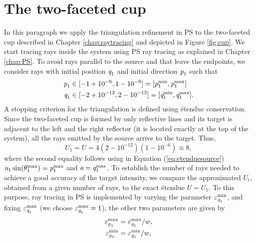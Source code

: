 \section{The two-faceted cup}
In this paragraph we apply the triangulation refinement in PS to the two-faceted cup described in Chapter \ref{chap:raytracing} and depicted in Figure \ref{fig:cup}. 
We start tracing rays inside the system using PS ray tracing as explained in Chapter \ref{chap:PS}. To avoid rays parallel to the source and that leave the endpoints, we consider rays with initial position $\textit{q}_1$ and initial direction $\textit{p}_1$ such that 
\begin{equation*}
\begin{aligned}
\textit{p}_1&\in[-1+10^{-6},1-10^{-6}] = [\textit{p}_1^{\textrm{min}}, \textit{p}_1^{\textrm{max}}] \\ 
\textit{q}_1&\in[-2+10^{-12}, 2-10^{-12}] = [\textit{q}_1^{\textrm{min}}, \textit{q}_1^{\textrm{max}}].
\end{aligned}
\end{equation*} 
A stopping criterion for the triangulation is defined using \'{e}tendue conservation. Since the two-faceted cup is formed by only reflective lines and its target is adjacent to the left and the right reflector (it is located exactly at the top of the system),  all the rays emitted by the source arrive to the target. Thus, 
\begin{equation}U_1 = U = 4(2-10^{-12})(1-10^{-6})\approx 8, \end{equation}
where the second equality follows using in Equation (\ref{eq:etenduesource}) $\textit{n}_1\sin(\theta_1^{\textrm{max}})=\textit{p}_1^\textrm{max}$ and $\textit{a}=\textit{q}_1^{\textrm{max}}$. To establish the number of rays needed to achieve a good accuracy of the target intensity, we compare the approximated $U_{\textrm{t}}$, obtained from a given number of rays, to the exact \'{e}tendue $U=U_1$. 
To this purpose, ray tracing in PS is implemented by varying the parameter $\varepsilon_{\textit{q}_1}^{\textrm{min}}$, and fixing  $\varepsilon_{\textit{q}_1}^{\textrm{max}}$ (we choose $\varepsilon_{\textit{q}_1}^{\textrm{max}}=1$), the other two parameters are given by
\begin{equation}\label{eq:parameters_cup}
\begin{aligned} 
\varepsilon_{\textit{p}_1}^{\textrm{max}} &= \varepsilon_{\textit{q}_1}^{\textrm{max}}/w, \\
\varepsilon_{\textit{p}_1}^{\textrm{min}}&= \varepsilon_{\textit{q}_1}^{\textrm{min}}/w,
 \end{aligned}
\end{equation}
